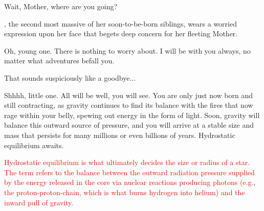 \documentclass[main.tex]{subfiles}
\begin{document}
\par \Maia Wait, Mother, where are you going?  

\par \nar \rmmaia, the second most massive of her soon-to-be-born siblings, wears a worried expression upon her face that begets deep concern for her fleeting Mother.  





\par \Pleione Oh, young one.  There is nothing to worry about.  I will be with you always, no matter what adventures befall you.  

\par \Maia That sounds suspiciously like a goodbye...

\par \Pleione Shhhh, little one.  All will be well, you will see.  You are only just now born and still contracting, as gravity continues to find its balance with the fires that now rage within your belly, spewing out energy in the form of light.  Soon, gravity will balance this outward source of pressure, and you will arrive at a stable size and mass that persists for many millions or even billions of years.  Hydrostatic equilibrium awaits.

\begin{tcolorbox}[sharp corners, colback=red!30, colframe=red!80!blue, title=Hydrostatic Equilibrium]
\par \textcolor{red} {Hydrostatic equilibrium is what ultimately decides the size or radius of a star.  The term refers to the balance between the outward radiation pressure supplied by the energy released in the core via nuclear reactions producing photons (e.g., the proton-proton-chain, which is what burns hydrogen into helium) and the inward pull of gravity.}
\end{tcolorbox}
\end{document}
